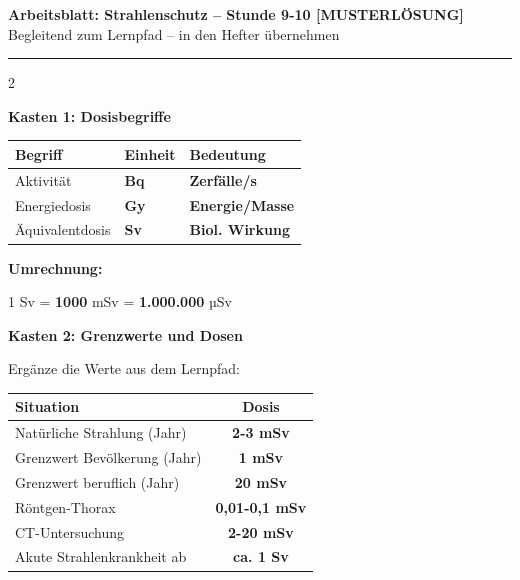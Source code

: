 \documentclass[10pt, a4paper]{article}
\newcommand{\fachfarbe}{physik}
\newcommand{\thema}{Strahlenschutz}
\newcommand{\stunde}{Stunde 9-10}
\newcommand{\lsg}[1]{\textcolor{loesung}{\textbf{#1}}}
\newcommand{\abschnitt}[1]{%
    \vspace{8pt}\noindent\textbf{\textcolor{\fachfarbe}{#1}}\vspace{4pt}
}
\begin{document}
\begin{center}
{\large\bfseries Arbeitsblatt: \thema{} -- \stunde{} \textcolor{loesung}{[MUSTERLÖSUNG]}}\\[2pt]
{\small\textcolor{grau}{Begleitend zum Lernpfad -- in den Hefter übernehmen}}
\end{center}
\vspace{-2pt}\hrule\vspace{8pt}

\begin{multicols}{2}
\small


\abschnitt{Kasten 1: Dosisbegriffe}

\begin{merksatz}
\renewcommand{\arraystretch}{1.6}
\begin{tabular}{|p{2.2cm}|p{1.5cm}|p{2.3cm}|}
\hline
\textbf{Begriff} & \textbf{Einheit} & \textbf{Bedeutung} \\
\hline
Aktivität & \lsg{Bq} & \lsg{Zerfälle/s} \\
\hline
Energiedosis & \lsg{Gy} & \lsg{Energie/Masse} \\
\hline
Äquivalentdosis & \lsg{Sv} & \lsg{Biol. Wirkung} \\
\hline
\end{tabular}
\renewcommand{\arraystretch}{1}

\vspace{6pt}

\textbf{Umrechnung:}

1 Sv = \lsg{1000} mSv = \lsg{1.000.000} µSv
\end{merksatz}

\vspace{6pt}


\abschnitt{Kasten 2: Grenzwerte und Dosen}

\begin{merksatz}[Übersicht]
Ergänze die Werte aus dem Lernpfad:

\vspace{4pt}
\renewcommand{\arraystretch}{1.4}
\begin{tabular}{|p{3.5cm}|c|}
\hline
\textbf{Situation} & \textbf{Dosis} \\
\hline
Natürliche Strahlung (Jahr) & \lsg{2-3 mSv} \\
\hline
Grenzwert Bevölkerung (Jahr) & \lsg{1 mSv} \\
\hline
Grenzwert beruflich (Jahr) & \lsg{20 mSv} \\
\hline
Röntgen-Thorax & \lsg{0,01-0,1 mSv} \\
\hline
CT-Untersuchung & \lsg{2-20 mSv} \\
\hline
Akute Strahlenkrankheit ab & \lsg{ca. 1 Sv} \\
\hline
\end{tabular}
\renewcommand{\arraystretch}{1}
\end{merksatz}


\end{multicols}
\end{document}
